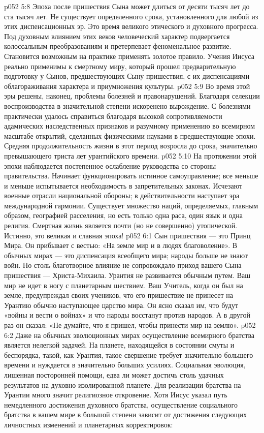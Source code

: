 \vs p052 5:8 \pc Эпоха после пришествия Сына может длиться от десяти тысяч лет до ста тысяч лет. Не существует определенного срока, установленного для любой из этих диспенсационных эр. Это время великого этического и духовного прогресса. Под духовным влиянием этих веков человеческий характер подвергается колоссальным преобразованиям и претерпевает феноменальное развитие. Становится возможным на практике применять золотое правило. Учения Иисуса реально применимы к смертному миру, который прошел предварительную подготовку у Сынов, предшествующих Сыну пришествия, с их диспенсациями облагораживания характера и приумножения культуры.
\vs p052 5:9 Во время этой эры решены, наконец, проблемы болезней и правонарушений. Благодаря селекции воспроизводства в значительной степени искоренено вырождение. С болезнями практически удалось справиться благодаря высокой сопротивляемости адамических наследственных признаков и разумному применению во всемирном масштабе открытий, сделанных физическими науками в предшествующие эпохи. Средняя продолжительность жизни в этот период возросла до срока, значительно превышающего триста лет урантийского времени.
\vs p052 5:10 На протяжении этой эпохи наблюдается постепенное ослабление руководства со стороны правительства. Начинает функционировать истинное самоуправление; все меньше и меньше испытывается необходимость в запретительных законах. Исчезают военные отрасли национальной обороны; в действительности наступает эра международной гармонии. Существует множество наций, определяемых, главным образом, географией расселения, но есть только одна раса, один язык и одна религия. Смертная жизнь является почти (но не совершенно) утопической. Истинно, это великая и славная эпоха!
\vs p052 6:1 Сын пришествия --- это Принц Мира. Он прибывает с вестью: «На земле мир и в людях благоволение». В обычных мирах --- это диспенсация всеобщего мира; народы больше не знают войн. Но столь благотворное влияние не сопровождало приход вашего Сына пришествия --- Христа\hyp{}Михаила. Урантия не развивается обычным путем. Ваш мир не идет в ногу с планетарным шествием. Ваш Учитель, когда он был на земле, предупреждал своих учеников, что его пришествие не принесет на Урантию обычно наступающее царство мира. Он ясно сказал им, что будут «войны и вести о войнах» и что народы восстанут против народов. А в другой раз он сказал: «Не думайте, что я пришел, чтобы принести мир на землю».
\vs p052 6:2 Даже на обычных эволюционных мирах осуществление всемирного братства является нелегкой задачей. На планете, находящейся в состоянии смуты и беспорядка, такой, как Урантия, такое свершение требует значительно большего времени и нуждается в значительно больших усилиях. Социальная эволюция, лишенная посторонней помощи, едва ли может достичь столь удачных результатов на духовно изолированной планете. Для реализации братства на Урантии много значит религиозное откровение. Хотя Иисус указал путь немедленного достижения духовного братства, осуществление социального братства в вашем мире в большой степени зависит от достижения следующих личностных изменений и планетарных корректировок:
